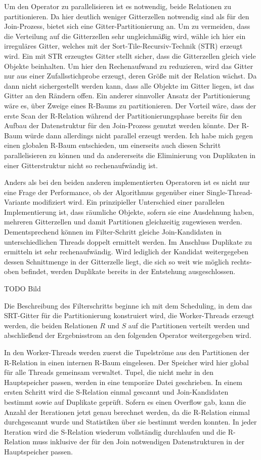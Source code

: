 \documentclass[a4paper,12pt,twoside]{article}
\begin{document}
Um den Operator zu parallelisieren ist es notwendig, beide Relationen zu partitionieren. Da hier deutlich weniger Gitterzellen notwendig sind als für den Join-Prozess, bietet sich eine Gitter-Partitionierung an. Um zu vermeiden, dass die Verteilung auf die Gitterzellen sehr ungleichmäßig wird, wähle ich hier ein irreguläres Gitter, welches mit der Sort-Tile-Recursiv-Technik (STR) erzeugt wird. Ein mit STR erzeugtes Gitter stellt sicher, dass die Gitterzellen gleich viele Objekte beinhalten. Um hier den Rechenaufwand zu reduzieren, wird das Gitter nur aus einer Zufallsstichprobe erzeugt, deren Größe mit der Relation wächst. Da dann nicht sichergestellt werden kann, dass alle Objekte im Gitter liegen, ist das Gitter an den Rändern offen. Ein anderer sinnvoller Ansatz der Partitionierung wäre es, über Zweige eines R-Baums zu partitionieren. Der Vorteil wäre, dass der erste Scan der R-Relation während der Partitionierungsphase bereits für den Aufbau der Datenstruktur für den Join-Prozess genutzt werden könnte. Der R-Baum würde dann allerdings nicht parallel erzeugt werden. Ich habe mich gegen einen globalen R-Baum entschieden, um einerseits auch diesen Schritt parallelisieren zu können und da andererseits die Eliminierung von Duplikaten in einer Gitterstruktur nicht so rechenaufwändig ist.

Anders als bei den beiden anderen implementierten Operatoren ist es nicht nur eine Frage der Performance, ob der Algorithmus gegenüber einer Single-Thread-Variante modifiziert wird. Ein prinzipieller Unterschied einer parallelen Implementierung ist, dass räumliche Objekte, sofern sie eine Ausdehnung haben, mehreren Gitterzellen und damit Partitionen gleichzeitig zugewiesen werden. Dementsprechend können im Filter-Schritt gleiche Join-Kandidaten in unterschiedlichen Threads doppelt ermittelt werden. Im Anschluss Duplikate zu ermitteln ist sehr rechenaufwändig. Wird lediglich der Kandidat weitergegeben dessen Schnittmenge in der Gitterzelle liegt, die sich so weit wie möglich rechts-oben befindet, werden Duplikate bereits in der Entstehung ausgeschlossen.

TODO Bild

Die Beschreibung des Filterschritts beginne ich mit dem Scheduling, in dem das SRT-Gitter für die Partitionierung konstruiert wird, die Worker-Threads erzeugt werden, die beiden Relationen $R$ und $S$ auf die Partitionen verteilt werden und abschließend der Ergebnisstrom an den folgenden Operator weitergegeben wird.

In den Worker-Threads werden zuerst die Tupelströme aus den Partitionen der R-Relation in einen internen R-Baum eingelesen. Der Speicher wird hier global für alle Threads gemeinsam verwaltet. Tupel, die nicht mehr in den Hauptspeicher passen, werden in eine temporäre Datei geschrieben. In einem ersten Schritt wird die S-Relation einmal gescannt und Join-Kandidaten bestimmt sowie auf Duplikate geprüft.  Sofern es einen Overflow gab, kann die Anzahl der Iterationen jetzt genau berechnet werden, da die R-Relation einmal durchgescannt wurde und Statistiken über sie bestimmt werden konnten. In jeder Iteration wird die S-Relation wiederum vollständig durchlaufen und die R-Relation muss inklusive der für den Join notwendigen Datenstrukturen in der Hauptspeicher passen.
\end{document}

